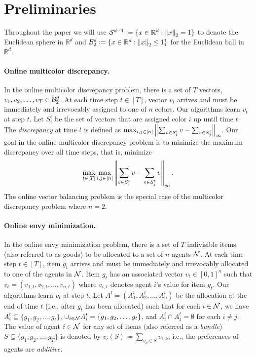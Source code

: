 \section{Preliminaries}\label{sec:prelims}

Throughout the paper we will use $\mathcal{S}^{d-1} \vcentcolon= \{ x \in \mathbb{R}^d : \left\lVert x\right\rVert_2 = 1 \}$ to denote the Euclidean sphere in $\mathbb{R}^d$ and $\mathcal{B}^d_2 \vcentcolon= \{ x \in \mathbb{R}^d : \left\lVert x\right\rVert_2 \leq 1 \}$ for the Euclidean ball in $\mathbb{R}^d$. 

\paragraph{Online multicolor discrepancy.} 

In the online multicolor discrepancy problem, there is a set of $T$ vectors, $v_1, v_2, \dots, v_T \in \mathcal{B}^d_2$. At each time step $t \in [T]$, vector $v_t$ arrives and must be immediately and irrevocably assigned to one of $n$ colors. Our algorithms learn $v_t$ at step $t$. Let $S^t_i$ be the set of vectors that are assigned color $i$ up until time $t$. The \emph{discrepancy} at time $t$ is defined as $\max_{i,j \in [n]} \left\lVert \sum_{v \in S^t_i} v - \sum_{v \in S^t_j} \right\rVert_{\infty}$.
Our goal in the online multicolor discrepancy problem is to minimize the maximum discrepancy over all time steps, that is, minimize $$\max_{t \in [T]} \max_{i,j \in [n]} \left\lVert \sum_{v \in S^t_i} v - \sum_{v \in S^t_j} v \right\rVert_{\infty}.$$ The online vector balancing problem is the special case of the multicolor discrepancy problem where $n=2$.

\paragraph{Online envy minimization.} 

In the online envy minimization problem, there is a set of $T$ indivisible items (also referred to as goods) to be allocated to a set of $n$ agents $\mathcal{N}$. At each time step $t \in [T]$, item $g_t$ arrives and must be immediately and irrevocably allocated to one of the agents in $\mathcal{N}$. Item $g_t$ has an associated vector $v_t \in [0,1]^n$ such that $v_t = (v_{1,t}, v_{2,t}, \ldots, v_{n,t})$ where $v_{i,t}$ denotes agent $i$'s value for item $g_t$. Our algorithms learn $v_t$ at step $t$. Let $A^t = (A^t_1, A^t_2, \ldots, A^t_n)$ be the allocation at the end of time $t$ (i.e., after $g_t$ has been allocated) such that for each $i \in \mathcal{N}$, we have $A^t_i \subseteq \{g_1, g_2, \ldots, g_t\}$, $\cup_{i\in \mathcal{N}} A^t_i = 
\{g_1, g_2, \ldots, g_t\}$, and $A^t_i \cap A^t_j = \emptyset$ for each $i \neq j$. The value of agent $i \in \mathcal{N}$ for any set of items (also referred as a \emph{bundle}) $S \subseteq \{g_1, g_2, \ldots, g_T\}$ is denoted by $v_i(S) \coloneqq \sum_{g_k \in S} v_{i,k}$, i.e., the preferences of agents are \emph{additive}.

